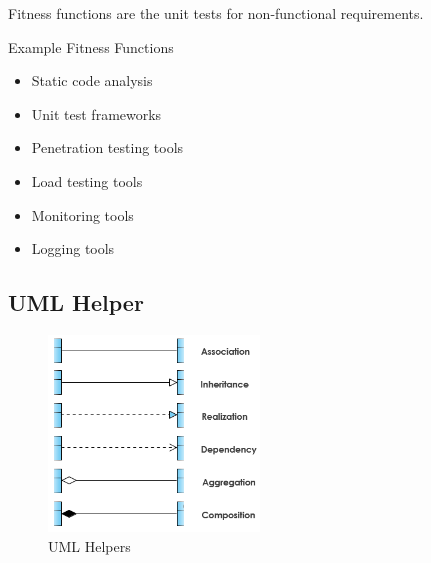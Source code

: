 Fitness functions are the unit tests for non-functional requirements.

Example Fitness Functions

\begin{itemize}
\tightlist
\item
  Static code analysis
\item
  Unit test frameworks
\item
  Penetration testing tools
\item
  Load testing tools
\item
  Monitoring tools
\item
  Logging tools
\end{itemize}


\subsection{UML Helper}
\begin{figure}[H]
\centering
\includegraphics[width=0.5\textwidth]{figures/UMLShorties.PNG}
\caption{UML Helpers}
\end{figure}

\clearpage